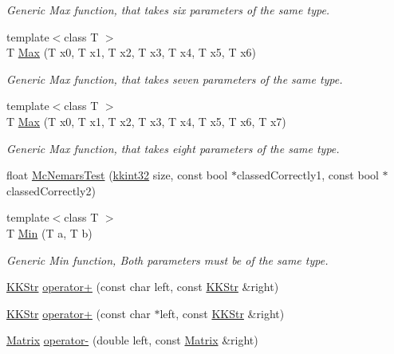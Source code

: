 \begin{DoxyCompactItemize}
\begin{DoxyCompactList}\small\item\em Generic Max function, that takes six parameters of the same type. \end{DoxyCompactList}\item 
{\footnotesize template$<$class T $>$ }\\T \hyperlink{namespace_k_k_b_a1d5c405ec1b3cbb4a7b1ff88f221725d}{Max} (T x0, T x1, T x2, T x3, T x4, T x5, T x6)
\begin{DoxyCompactList}\small\item\em Generic Max function, that takes seven parameters of the same type. \end{DoxyCompactList}\item 
{\footnotesize template$<$class T $>$ }\\T \hyperlink{namespace_k_k_b_a680b9aa7735bf659d3bea57ccbf089e4}{Max} (T x0, T x1, T x2, T x3, T x4, T x5, T x6, T x7)
\begin{DoxyCompactList}\small\item\em Generic Max function, that takes eight parameters of the same type. \end{DoxyCompactList}\item 
float \hyperlink{namespace_k_k_b_a6e4e9821b69596ed7f5ef4c5554bbcf0}{Mc\+Nemars\+Test} (\hyperlink{namespace_k_k_b_a8fa4952cc84fda1de4bec1fbdd8d5b1b}{kkint32} size, const bool $\ast$classed\+Correctly1, const bool $\ast$classed\+Correctly2)
\item 
{\footnotesize template$<$class T $>$ }\\T \hyperlink{namespace_k_k_b_ad030d1ca8bd5038824c4a923a4d23fb5}{Min} (T a, T b)
\begin{DoxyCompactList}\small\item\em Generic Min function, Both parameters must be of the same type. \end{DoxyCompactList}\item 
\hyperlink{class_k_k_b_1_1_k_k_str}{K\+K\+Str} \hyperlink{namespace_k_k_b_adebce4bd76311aae0f763d2b328efad7}{operator+} (const char left, const \hyperlink{class_k_k_b_1_1_k_k_str}{K\+K\+Str} \&right)
\item 
\hyperlink{class_k_k_b_1_1_k_k_str}{K\+K\+Str} \hyperlink{namespace_k_k_b_aa9d1d5da0714c92ef76ff24faeae50dd}{operator+} (const char $\ast$left, const \hyperlink{class_k_k_b_1_1_k_k_str}{K\+K\+Str} \&right)
\item 
\hyperlink{class_k_k_b_1_1_matrix}{Matrix} \hyperlink{namespace_k_k_b_a55b2e6254cfaf7048155331d70c5ab6f}{operator-\/} (double left, const \hyperlink{class_k_k_b_1_1_matrix}{Matrix} \&right)

\end{DoxyCompactItemize}

